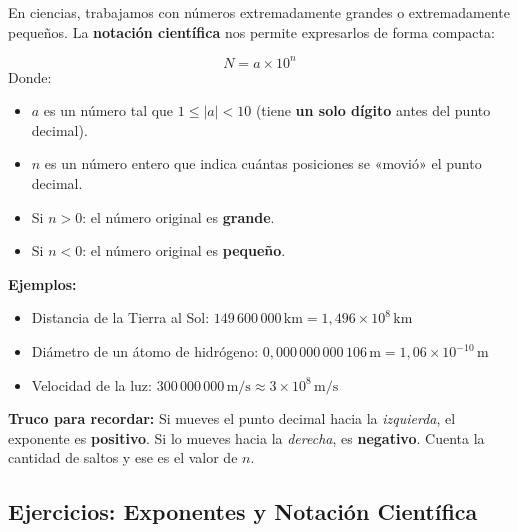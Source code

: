 \documentclass[12pt, a4paper]{article}
\begin{document}
En ciencias, trabajamos con números extremadamente grandes o extremadamente pequeños. La \textbf{notación científica} nos permite expresarlos de forma compacta:

\begin{cuadrosolucion}
$$N = a \times 10^n$$
Donde:
\begin{itemize}[leftmargin=*]
  \item $a$ es un número tal que $1 \leq |a| < 10$ (tiene \textbf{un solo dígito} antes del punto decimal).
  \item $n$ es un número entero que indica cuántas posiciones se «movió» el punto decimal.
  \item Si $n > 0$: el número original es \textbf{grande}.
  \item Si $n < 0$: el número original es \textbf{pequeño}.
\end{itemize}
\end{cuadrosolucion}

\noindent\textbf{Ejemplos:}
\begin{itemize}
  \item Distancia de la Tierra al Sol: $149\,600\,000\,\text{km} = 1{,}496 \times 10^8\,\text{km}$
  \item Diámetro de un átomo de hidrógeno: $0{,}000\,000\,000\,106\,\text{m} = 1{,}06 \times 10^{-10}\,\text{m}$
  \item Velocidad de la luz: $300\,000\,000\,\text{m/s} \approx 3 \times 10^8\,\text{m/s}$
\end{itemize}

\begin{cuadroadvertencia}
\textbf{Truco para recordar:} Si mueves el punto decimal hacia la \emph{izquierda}, el exponente es \textbf{positivo}. Si lo mueves hacia la \emph{derecha}, es \textbf{negativo}. Cuenta la cantidad de saltos y ese es el valor de $n$.
\end{cuadroadvertencia}

\newpage

\subsection{Ejercicios: Exponentes y Notación Científica}
\end{document}

